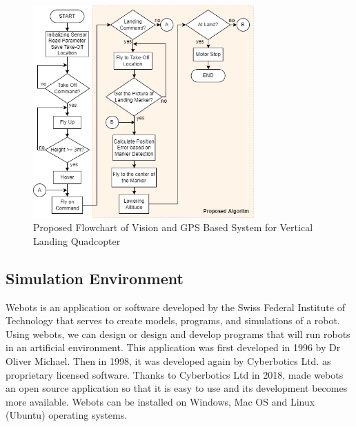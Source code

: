 \documentclass[a4paper]{jpconf}
\begin{document}
\begin{figure}[h]
    \centering
    \includegraphics[width=20pc]{flowchart-proposed-algorithm.png}
    \caption{\label{label}Proposed Flowchart of Vision and GPS Based System for Vertical Landing Quadcopter}
\end{figure}

\subsection{Simulation Environment}
Webots is an application or software developed by the Swiss Federal Institute of Technology that serves to create models, programs, and simulations of a robot. Using webots, we can design or design and develop programs that will run robots in an artificial environment. This application was first developed in 1996 by Dr Oliver Michael. Then in 1998, it was developed again by Cyberbotics Ltd. as proprietary licensed software. Thanks to Cyberbotics Ltd in 2018, made webots an open source application so that it is easy to use and its development becomes more available. Webots can be installed on Windows, Mac OS and Linux (Ubuntu) operating systems.
\end{document}
